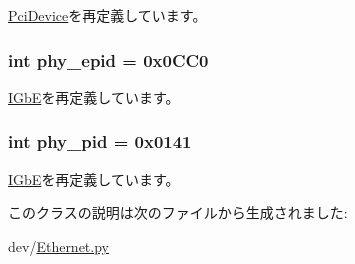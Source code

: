 \hyperlink{classPci_1_1PciDevice_aa90d1ebfb6ac8c64983451e2196e342f}{PciDevice}を再定義しています。\hypertarget{classEthernet_1_1IGbE__igb_a5bb971e985d09a29903843736a36c7d8}{
\subsubsection[{phy\_\-epid}]{\setlength{\rightskip}{0pt plus 5cm}int {\bf phy\_\-epid} = 0x0CC0}}
\label{classEthernet_1_1IGbE__igb_a5bb971e985d09a29903843736a36c7d8}


\hyperlink{classEthernet_1_1IGbE_aa5410782903449f47b14de3c73f6cb49}{IGbE}を再定義しています。\hypertarget{classEthernet_1_1IGbE__igb_a229cca8e73c20d1d9c9089d20967f7fa}{
\subsubsection[{phy\_\-pid}]{\setlength{\rightskip}{0pt plus 5cm}int {\bf phy\_\-pid} = 0x0141}}
\label{classEthernet_1_1IGbE__igb_a229cca8e73c20d1d9c9089d20967f7fa}


\hyperlink{classEthernet_1_1IGbE_a3cdba89a4899636d7e18cc917992ca1d}{IGbE}を再定義しています。

このクラスの説明は次のファイルから生成されました:\begin{DoxyCompactItemize}
\item 
dev/\hyperlink{Ethernet_8py}{Ethernet.py}\end{DoxyCompactItemize}
